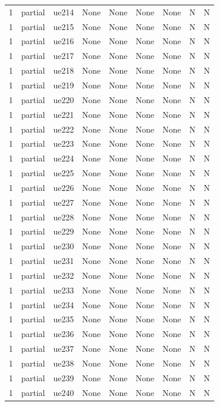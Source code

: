 \begin{table}[ht]
\begin{tabular}{|c|c|c|c|c|c|c|c|c|}
1 & partial & ue214 & None & None & None & None & N & N \\
1 & partial & ue215 & None & None & None & None & N & N \\
1 & partial & ue216 & None & None & None & None & N & N \\
1 & partial & ue217 & None & None & None & None & N & N \\
1 & partial & ue218 & None & None & None & None & N & N \\
1 & partial & ue219 & None & None & None & None & N & N \\
1 & partial & ue220 & None & None & None & None & N & N \\
1 & partial & ue221 & None & None & None & None & N & N \\
1 & partial & ue222 & None & None & None & None & N & N \\
1 & partial & ue223 & None & None & None & None & N & N \\
1 & partial & ue224 & None & None & None & None & N & N \\
1 & partial & ue225 & None & None & None & None & N & N \\
1 & partial & ue226 & None & None & None & None & N & N \\
1 & partial & ue227 & None & None & None & None & N & N \\
1 & partial & ue228 & None & None & None & None & N & N \\
1 & partial & ue229 & None & None & None & None & N & N \\
1 & partial & ue230 & None & None & None & None & N & N \\
1 & partial & ue231 & None & None & None & None & N & N \\
1 & partial & ue232 & None & None & None & None & N & N \\
1 & partial & ue233 & None & None & None & None & N & N \\
1 & partial & ue234 & None & None & None & None & N & N \\
1 & partial & ue235 & None & None & None & None & N & N \\
1 & partial & ue236 & None & None & None & None & N & N \\
1 & partial & ue237 & None & None & None & None & N & N \\
1 & partial & ue238 & None & None & None & None & N & N \\
1 & partial & ue239 & None & None & None & None & N & N \\
1 & partial & ue240 & None & None & None & None & N & N \\

\end{tabular}
\end{table}
